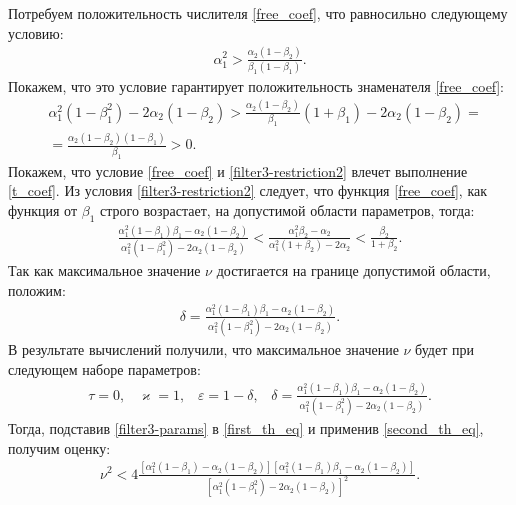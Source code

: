 \documentclass[a4paper,article,14pt]{extarticle}
\begin{document}
Потребуем положительность числителя \eqref{free_coef}, что равносильно следующему условию:
\begin{equation}\label{filter3-restriction2}
 \begin{aligned}
\alpha_1^2 > \frac{\alpha_2(1-\beta_2)}{\beta_1(1-\beta_1)}.
 \end{aligned}
 \end{equation}
Покажем, что это условие гарантирует положительность знаменателя \eqref{free_coef}:
\begin{equation}
 \begin{aligned}
&\alpha_1^2(1-\beta_1^2) - 2\alpha_2(1-\beta_2) > \frac{\alpha_2(1-\beta_2)}{\beta_1}(1+\beta_1) - 2\alpha_2(1-\beta_2) =\\
&= \frac{\alpha_2(1-\beta_2)(1 - \beta_1)}{\beta_1} > 0.
 \end{aligned}
\end{equation}
Покажем, что условие \eqref{free_coef} и \eqref{filter3-restriction2} влечет выполнение \eqref{t_coef}. Из условия \eqref{filter3-restriction2} следует, что функция \eqref{free_coef}, как функция от  $\beta_1$ строго возрастает, на допустимой области параметров, тогда:
 \begin{align}
\frac{\alpha_1^2(1-\beta_1)\beta_1 - \alpha_2(1-\beta_2)}{\alpha_1^2(1-\beta_1^2) - 2\alpha_2(1-\beta_2)} < \frac{\alpha_1^2\beta_2 - \alpha_2}{\alpha_1^2(1+\beta_2) - 2\alpha_2} < \frac{\beta_2}{1+\beta_2}.
 \end{align}
Так как максимальное значение $\nu$ достигается на границе допустимой области, положим:
 \begin{equation}\label{filter3_positive_numerator}
 \begin{aligned}
\delta = \frac{\alpha_1^2(1-\beta_1)\beta_1 - \alpha_2(1-\beta_2)}{\alpha_1^2(1-\beta_1^2) - 2\alpha_2(1-\beta_2)}.
 \end{aligned}
 \end{equation}
В результате вычислений получили, что максимальное значение $\nu$ будет при следующем наборе параметров:
\begin{equation}\label{filter3-params}
 \begin{aligned}
 \tau = 0 \text{,} \quad
 \varkappa = 1 \text{,} \quad
 \varepsilon = 1-\delta \text{,} \quad
 \delta = \frac{\alpha_1^2(1-\beta_1)\beta_1 - \alpha_2(1-\beta_2)}{\alpha_1^2(1-\beta_1^2) - 2\alpha_2(1-\beta_2)}.
 \end{aligned}
\end{equation}
Тогда, подставив \eqref{filter3-params} в \eqref{first_th_eq} и применив \eqref{second_th_eq}, получим оценку:
 \begin{equation}
 \begin{aligned}
\nu^2 < 4\frac{[\alpha_1^2(1-\beta_1) - \alpha_2(1-\beta_2)][\alpha_1^2(1-\beta_1)\beta_1 - \alpha_2(1-\beta_2)]}{[\alpha_1^2(1-\beta_1^2) - 2\alpha_2(1-\beta_2)]^2}.
 \end{aligned}
 \end{equation}
 
\end{document}
